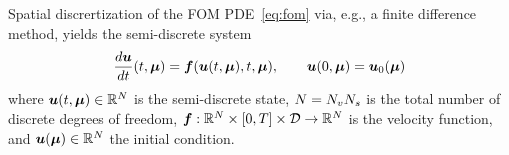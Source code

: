 \documentclass[3p,computermodern,10pt]{elsarticle}
\begin{document}
Spatial discrertization of the FOM PDE~\eqref{eq:fom} via, e.g., a finite difference method, yields the semi-discrete system  
\begin{equation}\label{eq:fom_ode}
\frac{d \boldsymbol u}{dt}(t,\boldsymbol \mu) = \boldsymbol f(\boldsymbol u(t,\boldsymbol \mu),t,\boldsymbol \mu), \qquad \boldsymbol u(0,\boldsymbol \mu) = \boldsymbol u_0(\boldsymbol \mu)
\end{equation}
where $\boldsymbol u(t,\boldsymbol \mu) \in \mathbb{R}^{N}$ is the semi-discrete state, $N = N_v N_s$ is the total number of discrete degrees of freedom, $\boldsymbol f: \mathbb{R}^{N} \times [0,T] \times \mathcal{D} \rightarrow \mathbb{R}^{N}$ is the velocity function, and $\boldsymbol u(\boldsymbol \mu) \in \mathbb{R}^{N}$ the initial condition. 
\end{document}
